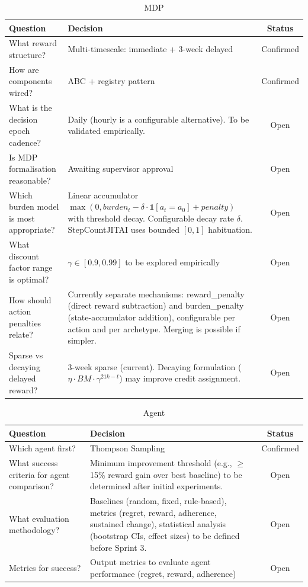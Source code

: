 \documentclass[11pt,a4paper]{article}
\begin{document}
\begin{table}[H]
\centering
\caption{MDP}
\begin{tabular}{p{}p{}c}
\toprule
Question & Decision & Status \\
\midrule
What reward structure? & Multi-timescale: immediate + 3-week delayed & Confirmed \\
How are components wired? & ABC + registry pattern & Confirmed \\
\midrule
What is the decision epoch cadence? & Daily (hourly is a configurable alternative). To be validated empirically. & Open \\
Is MDP formalisation reasonable? & Awaiting supervisor approval & Open \\
Which burden model is most appropriate? & Linear accumulator $\max(0, burden_t - \delta \cdot \mathbb{1}[a_t=a_0] + penalty)$ with threshold decay. Configurable decay rate $\delta$. StepCountJITAI uses bounded $[0,1]$ habituation. & Open \\
What discount factor range is optimal? & $\gamma \in [0.9, 0.99]$ to be explored empirically & Open \\
How should action penalties relate? & Currently separate mechanisms: reward\_penalty (direct reward subtraction) and burden\_penalty (state-accumulator addition), configurable per action and per archetype. Merging is possible if simpler. & Open \\
Sparse vs decaying delayed reward? & 3-week sparse (current). Decaying formulation ($\eta \cdot BM \cdot \gamma^{21k-t}$) may improve credit assignment. & Open \\
\bottomrule
\end{tabular}
\end{table}

\begin{table}[H]
\centering
\caption{Agent}
\begin{tabular}{p{}p{}c}
\toprule
Question & Decision & Status \\
\midrule
Which agent first? & Thompson Sampling & Confirmed \\
\midrule
What success criteria for agent comparison? & Minimum improvement threshold (e.g., $\geq$15\% reward gain over best baseline) to be determined after initial experiments. & Open \\
What evaluation methodology? & Baselines (random, fixed, rule-based), metrics (regret, reward, adherence, sustained change), statistical analysis (bootstrap CIs, effect sizes) to be defined before Sprint 3. & Open \\
Metrics for success? & Output metrics to evaluate agent performance (regret, reward, adherence) & Open \\
\bottomrule
\end{tabular}
\end{table}
\end{document}
